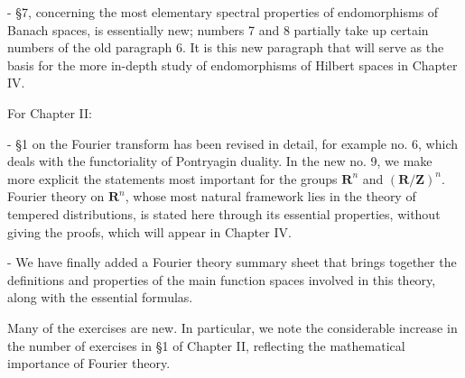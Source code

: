 - §7, concerning the most elementary spectral properties of endomorphisms of Banach spaces, is essentially new; numbers 7 and 8 partially take up certain numbers of the old paragraph 6. It is this new paragraph that will serve as the basis for the more in-depth study of endomorphisms of Hilbert spaces in Chapter IV.

For Chapter II:

- §1 on the Fourier transform has been revised in detail, for example no. 6, which deals with the functoriality of Pontryagin duality. In the new no. 9, we make more explicit the statements most important for the groups \(\mathbf{R}^n\) and \((\mathbf{R}/\mathbf{Z})^n\). Fourier theory on \(\mathbf{R}^n\), whose most natural framework lies in the theory of tempered distributions, is stated here through its essential properties, without giving the proofs, which will appear in Chapter IV.

- We have finally added a Fourier theory summary sheet that brings together the definitions and properties of the main function spaces involved in this theory, along with the essential formulas.

Many of the exercises are new. In particular, we note the considerable increase in the number of exercises in §1 of Chapter II, reflecting the mathematical importance of Fourier theory.

